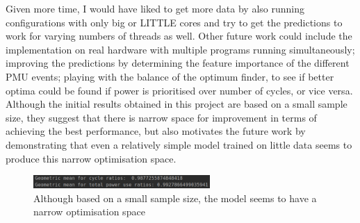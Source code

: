 Given more time, I would have liked to get more data by also running 
configurations with only big or LITTLE cores and try to get the predictions to 
work for varying numbers of threads as well. Other future work could include 
the implementation on real hardware with multiple programs running 
simultaneously; improving the predictions by determining the feature importance 
of the different PMU events; playing with the balance of the optimum finder, to 
see if better optima could be found if power is prioritised over number of 
cycles, or vice versa. Although the initial results obtained in this project 
are based on a small sample size, they suggest that there is narrow space for 
improvement in terms of achieving the best performance, but also motivates the 
future work by demonstrating that even a relatively simple model trained on 
little data seems to produce this narrow optimisation space.
\begin{figure}[H]
    \centering
    \includegraphics[width=0.6\textwidth]{screenshots/promising-geomeans.png}
    \caption{Although based on a small sample size, the model seems to have a
             narrow optimisation space}
\end{figure}
